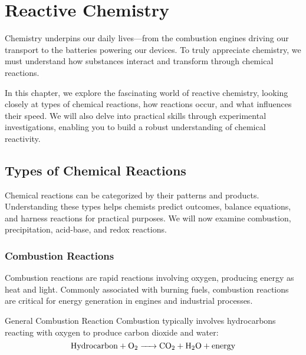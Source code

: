 \chapter{Reactive Chemistry}

Chemistry underpins our daily lives—from the combustion engines driving our transport to the batteries powering our devices. To truly appreciate chemistry, we must understand how substances interact and transform through chemical reactions. 

In this chapter, we explore the fascinating world of reactive chemistry, looking closely at types of chemical reactions, how reactions occur, and what influences their speed. We will also delve into practical skills through experimental investigations, enabling you to build a robust understanding of chemical reactivity.

\section{Types of Chemical Reactions}
\FloatBarrier
\FloatBarrier
\FloatBarrier

Chemical reactions can be categorized by their patterns and products. Understanding these types helps chemists predict outcomes, balance equations, and harness reactions for practical purposes. We will now examine combustion, precipitation, acid-base, and redox reactions.

\subsection{Combustion Reactions}
\FloatBarrier
\FloatBarrier
\FloatBarrier

Combustion reactions are rapid reactions involving oxygen, producing energy as heat and light. Commonly associated with burning fuels, combustion reactions are critical for energy generation in engines and industrial processes.

\begin{keyconcept}{General Combustion Reaction}
Combustion typically involves hydrocarbons reacting with oxygen to produce carbon dioxide and water:
\[
\ce{Hydrocarbon + O2 -> CO2 + H2O + energy}
\]
\end{keyconcept}

